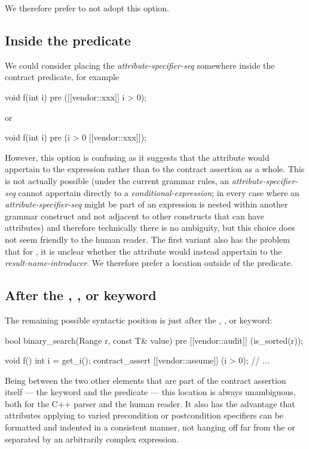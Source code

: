 We therefore prefer to not adopt this option.

\subsection{Inside the predicate}

We could consider placing the  \emph{attribute-specifier-seq} somewhere inside the contract predicate, for example
\begin{codeblock}
void f(int i) 
  pre ([[vendor::xxx]] i > 0);
\end{codeblock}
or
\begin{codeblock}
void f(int i) 
  pre (i > 0 [[vendor::xxx]]);
\end{codeblock}
However, this option is confusing as it suggests that the attribute would appertain to the expression rather than to the contract assertion as a whole. This is not actually possible (under the current grammar rules, an \emph{attribute-specifier-seq} cannot appertain directly to a \emph{conditional-expression}; in every case where an \emph{attribute-specifier-seq} might be part of an expression is nested within another grammar construct and not adjacent to other constructs that can have attributes) and therefore technically there is no ambiguity, but this choice does not seem friendly to the human reader. The  first variant also has the problem that for , it is unclear whether the attribute would instead appertain to the \emph{result-name-introducer}. We therefore prefer a location outside of the predicate.

\subsection{After the , , or  keyword}

The remaining possible syntactic position is just after the , , or  keyword:

\begin{codeblock}
bool binary_search(Range r, const T& value)
  pre [[vendor::audit]] (is_sorted(r));
  
void f() {
  int i = get_i();
  contract_assert [[vendor::assume]] (i > 0);
  // ...
}
\end{codeblock}

Being between the two other elements that are part of the contract assertion itself --- the keyword and the predicate --- this location is always unambiguous, both for the C++ parser and the human reader. It also has the advantage that attributes applying to varied precondition or postcondition specifiers can be formatted and indented in a consistent manner, not hanging off far from the  or  separated by an arbitrarily complex expression.

